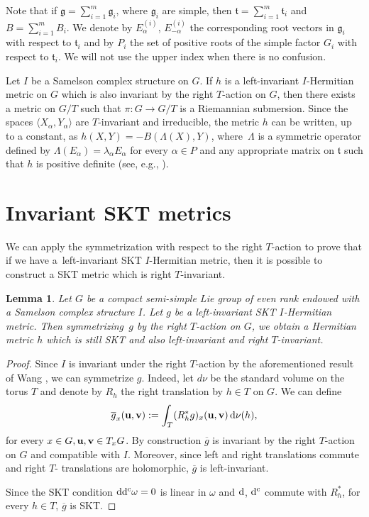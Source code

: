 \documentclass[10pt,a4paper]{amsart}
\numberwithin{equation}{section}
\newtheorem{Lemma}[Theorem]{Lemma}
\begin{document}
Note that if $ \mathfrak g = \sum_{i =1}^m \mathfrak g_i$, where $\mathfrak g_i$ are simple, then $\mathfrak t= \sum_{i=1}^m \mathfrak t_i$ and $B = \sum_{i=1}^m B_i$. We denote by $E_{\alpha}^{(i)}$, $E_{-\alpha}^{(i)}$ the corresponding root vectors in $\mathfrak g_i$ with respect to $\mathfrak t_i$ and by $P_i$ the set of positive roots of the simple factor $G_i$ with respect to $\mathfrak t_i$. We will not use the upper index when there is no confusion.

\begin{Remark} \label{remarkAkekseevski} Let $I$ be a Samelson complex structure on $G$. If $h$ is a left-invariant $I$-Hermitian metric on $G$ which is also invariant by the right $T$-action on $G$, then there exists a metric on $G/T$ such that $\pi\colon G\rightarrow G/T$ is a Riemannian submersion. Since the spaces $\langle X_{\alpha}, Y_{\alpha}\rangle$ are $T$-invariant and irreducible,
the metric $h$ can be written, up to a constant, as $h(X,Y)= -B (\Lambda(X),Y)$, where~$\Lambda$ is
a symmetric operator defined by $\Lambda(E_{\alpha})=\lambda_{\alpha} E_{\alpha}$ for every $\alpha \in P$ and any
appropriate matrix on $ \mathfrak t$ such that $h$ is positive definite (see, e.g., \cite{Arv}).
\end{Remark}

\section{Invariant SKT metrics}

 We can apply the symmetrization with respect to the right $T$-action to prove that if we have a~left-invariant SKT $I$-Hermitian metric,
then it is possible to construct a SKT metric which is right $T$-invariant.

\begin{Lemma}\label{llemma1}
Let $G$ be a compact semi-simple Lie group of even rank endowed with a Samelson complex structure $I$. Let $g$ be a left-invariant SKT $I$-Hermitian metric.
Then symmetrizing~$g$ by the right $T$-action on $G$, we obtain a Hermitian metric $h$ which is still SKT and also left-invariant and right $T$-invariant.
\end{Lemma}


\begin{proof} Since $I$ is invariant under the right $T$-action by the aforementioned result of Wang \cite{Wang}, we can symmetrize $g$. Indeed, let $d \nu$ be the standard volume on the torus $T$ and denote by $R_h$ the right translation by $h \in T$ on $G$. We can define
\[
 \overline{g}_x ({\bf u}, {\bf v}) := \int_T (R_h^* g)_x ({\bf u}, {\bf v}) \, {\rm d} \nu (h),
\]
for every $x \in G, {\bf u}, {\bf v} \in T_x G$. By construction $\overline{g}$ is invariant by the right $T$-action on $G$ and compatible with $I$. Moreover, since left and right translations commute and right $T$- translations are holomorphic, $\overline{g}$ is left-invariant.

Since the SKT condition ${\rm d}{\rm d}^{\rm c} \omega= 0$ is linear in $\omega$ and ${\rm d}$, ${\rm d}^{\rm c}$ commute with $R_h^*$, for every $ h \in T$, $\overline{g}$ is SKT. \end{proof}
\end{document}
